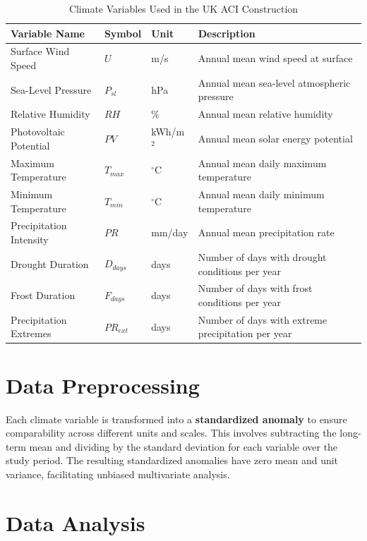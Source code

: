 \documentclass[12pt,a4paper]{report}
\begin{document}
\begin{table}[H]
\centering
\renewcommand{\arraystretch}{1}
\setlength{\tabcolsep}{15pt}

\begin{tabular}{lll>{\raggedright\arraybackslash}p{5cm}}
\hline
\textbf{Variable Name} & \textbf{Symbol} & \textbf{Unit} & \textbf{Description} \\
\hline
Surface Wind Speed & $U$ & m/s & Annual mean wind speed at surface \\
Sea-Level Pressure & $P_{sl}$ & hPa & Annual mean sea-level atmospheric pressure \\
Relative Humidity & $RH$ & \% & Annual mean relative humidity \\
Photovoltaic Potential & $PV$ & kWh/m$^2$ & Annual mean solar energy potential \\
Maximum Temperature & $T_{max}$ & $^\circ$C & Annual mean daily maximum temperature \\
Minimum Temperature & $T_{min}$ & $^\circ$C & Annual mean daily minimum temperature \\
Precipitation Intensity & $PR$ & mm/day & Annual mean precipitation rate \\
Drought Duration & $D_{days}$ & days & Number of days with drought conditions per year \\
Frost Duration & $F_{days}$ & days & Number of days with frost conditions per year \\
Precipitation Extremes & $PR_{ext}$ & days & Number of days with extreme precipitation per year \\
\hline
\end{tabular}
\caption{Climate Variables Used in the UK ACI Construction}
\label{tab:climate_factors}
\end{table}

\section{Data Preprocessing}
Each climate variable is transformed into a \textbf{standardized anomaly} to ensure comparability across different units and scales. This involves subtracting the long-term mean and dividing by the standard deviation for each variable over the study period. The resulting standardized anomalies have zero mean and unit variance, facilitating unbiased multivariate analysis.

\section{Data Analysis}
\end{document}
